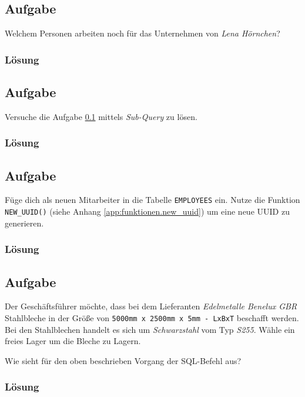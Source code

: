 \subsection{Aufgabe}
\label{sec:uebung_01.aufgabe_09}
Welchem Personen arbeiten noch für das Unternehmen von \textit{Lena Hörnchen}?

\subsubsection*{Lösung}
\label{sec:uebung_01.aufgabe_09.loesung}

\subsection{Aufgabe}
\label{sec:uebung_01.aufgabe_10}
Versuche die Aufgabe \ref{sec:uebung_01.aufgabe_09} mittels \textit{Sub-Query} zu lösen.

\subsubsection*{Lösung}
\label{sec:uebung_01.aufgabe_10.loesung}

\subsection{Aufgabe}
\label{sec:uebung_01.aufgabe_11}
Füge dich als neuen Mitarbeiter in die Tabelle \texttt{EMPLOYEES} ein. Nutze die Funktion \texttt{NEW\_UUID()} (siehe Anhang \ref{app:funktionen.new_uuid}) um eine neue UUID zu generieren.

\subsubsection*{Lösung}
\label{sec:uebung_01.aufgabe_11.loesung}

\subsection{Aufgabe}
\label{sec:uebung_01.aufgabe_12}
Der Geschäftsführer möchte, dass bei dem Lieferanten \textit{Edelmetalle Benelux GBR} Stahlbleche in der Größe von \texttt{5000mm x 2500mm x 5mm - LxBxT} beschafft werden. Bei den Stahlblechen handelt es sich um \textit{Schwarzstahl} vom Typ \textit{S255}. Wähle ein freies Lager um die Bleche zu Lagern.

Wie sieht für den oben beschrieben Vorgang der SQL-Befehl aus?

\subsubsection*{Lösung}
\label{sec:uebung_01.aufgabe_12.loesung}
